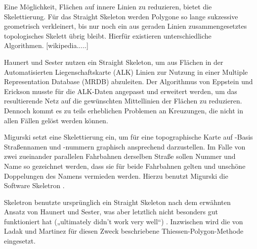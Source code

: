 \documentclass[../main/thesis.tex]{subfiles}
\begin{document}
Eine Möglichkeit, Flächen auf innere Linien zu reduzieren, bietet die Skelettierung. Für das Straight Skeleton werden Polygone so lange sukzessive geometrisch verkleinert, bis nur noch ein aus geraden Linien zusammengesetztes topologisches Skelett übrig bleibt. Hierfür existieren unterschiedliche Algorithmen. [wikipedia.....]


Haunert und Sester nutzen ein Straight Skeleton, um aus Flächen in der Automatisierten Liegenschaftskarte (ALK) Linien zur Nutzung in einer Multiple Representation Database (MRDB) abzuleiten. Der Algorithmus von Eppstein und Erickson  musste für die ALK-Daten angepasst und erweitert werden, um das resultierende Netz auf die gewünschten Mittellinien der Flächen zu reduzieren. Dennoch kommt es zu teils erheblichen Problemen an Kreuzungen, die nicht in allen Fällen gelöst werden können. 


Migurski setzt eine Skelettierung ein, um für eine topographische Karte auf \osm-Basis Straßennamen und -nummern graphisch ansprechend darzustellen. Im Falle von zwei zueinander parallelen Fahrbahnen derselben Straße sollen Nummer und Name so gezeichnet werden, dass sie für beide Fahrbahnen gelten und unschöne Doppelungen des Namens vermieden werden. Hierzu benutzt Migurski die Software Skeletron . 


Skeletron benutzte ursprünglich ein Straight Skeleton nach dem erwähnten Ansatz von Haunert und Sester, was aber letztlich nicht besonders gut funktioniert hat („ultimately didn't work very well“) . Inzwischen wird die von Ladak und Martinez für diesen Zweck beschriebene Thiessen-Polygon-Methode eingesetzt.
\end{document}
